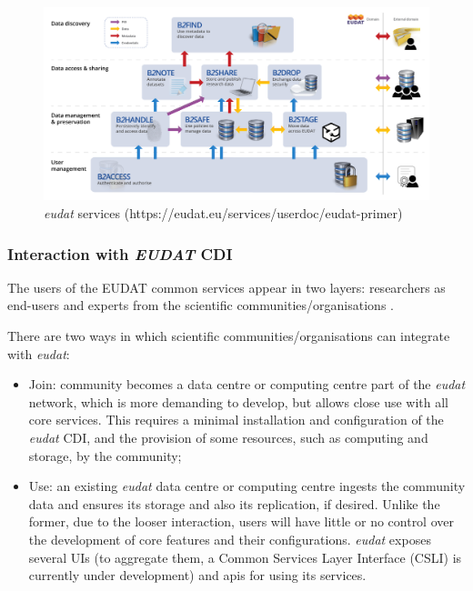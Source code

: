   
\begin{figure}[!h]
    \centering
    \includegraphics[width=1\textwidth]{img/state_of_the_art/eudat_services.png}
    \caption{\textit{\gls{eudat}} services (https://eudat.eu/services/userdoc/eudat-primer)}
    \label{fig:eudat_services}
\end{figure}
  
\subsubsection{Interaction with \textit{EUDAT} CDI}
  
 The users of the EUDAT common services appear in two layers: researchers as end-users and experts from the scientific communities/organisations \citep{damien}. 
 
 There are two ways in which scientific communities/organisations can integrate with \textit{\gls{eudat}}:

\begin{itemize}
    \item Join: community becomes a data centre or computing centre part of the \textit{\gls{eudat}} network, which is more demanding to develop, but allows close use with all core services. This requires a minimal installation and configuration of the \textit{\gls{eudat}} CDI, and the provision of some resources, such as computing and storage, by the community;
    \item Use: an existing \textit{\gls{eudat}} data centre or computing centre ingests the community data and ensures its storage and also its replication, if desired. Unlike the former, due to the looser interaction, users will have little or no control over the development of core features and their configurations. {\textit{\gls{eudat}}} exposes several UIs (to aggregate them, a {Common Services Layer Interface (CSLI)} is currently under development) and \gls{api}s for using its services.
\end{itemize}

